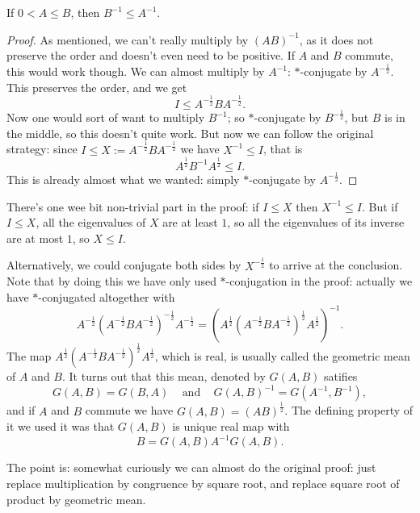\begin{lause}\label{inverse_decreasing}
	If $0 < A \leq B$, then $B^{-1} \leq A^{-1}$.
\end{lause}
\begin{proof}
	As mentioned, we can't really multiply by $(A B)^{-1}$, as it does not preserve the order and doesn't even need to be positive. If $A$ and $B$ commute, this would work though. We can almost multiply by $A^{-1}$: $*$-conjugate by $A^{-\frac{1}{2}}$. This preserves the order, and we get
	\[
		I \leq A^{-\frac{1}{2}} B A^{-\frac{1}{2}}.
	\]
	Now one would sort of want to multiply $B^{-1}$; so $*$-conjugate by $B^{-\frac{1}{2}}$, but $B$ is in the middle, so this doesn't quite work. But now we can follow the original strategy: since $I \leq X := A^{-\frac{1}{2}} B A^{-\frac{1}{2}}$ we have $X^{-1} \leq I$, that is
	\[
		A^{\frac{1}{2}} B^{-1} A^{\frac{1}{2}} \leq I.
	\]
	This is already almost what we wanted: simply $*$-conjugate by $A^{-\frac{1}{2}}$.
\end{proof}

There's one wee bit non-trivial part in the proof: if $I \leq X$ then $X^{-1} \leq I$. But if $I \leq X$, all the eigenvalues of $X$ are at least $1$, so all the eigenvalues of its inverse are at most $1$, so $X \leq I$.

\begin{huom}

Alternatively, we could conjugate both sides by $X^{-\frac{1}{2}}$ to arrive at the conclusion. Note that by doing this we have only used $*$-conjugation in the proof: actually we have $*$-conjugated altogether with 
\[
	A^{-\frac{1}{2}} (A^{-\frac{1}{2}}B A^{-\frac{1}{2}})^{-\frac{1}{2}} A^{-\frac{1}{2}} = (A^{\frac{1}{2}} (A^{-\frac{1}{2}}B A^{-\frac{1}{2}})^{\frac{1}{2}} A^{\frac{1}{2}})^{-1}.
\]
The map $A^{\frac{1}{2}} (A^{-\frac{1}{2}}B A^{-\frac{1}{2}})^{\frac{1}{2}} A^{\frac{1}{2}}$, which is real, is usually called the geometric mean of $A$ and $B$. It turns out that this mean, denoted by $G(A, B)$ satifies
\[
	G(A, B) = G(B, A) \;\;\; \text{ and } \;\;\; G(A, B)^{-1} = G(A^{-1}, B^{-1}),
\]
and if $A$ and $B$ commute we have $G(A, B) = (A B)^{\frac{1}{2}}$. The defining property of it we used it was that $G(A, B)$ is unique real map with
\[
	B = G(A, B) A^{-1} G(A, B).
\]

The point is: somewhat curiously we can almost do the original proof: just replace multiplication by congruence by square root, and replace square root of product by geometric mean.

\end{huom}

